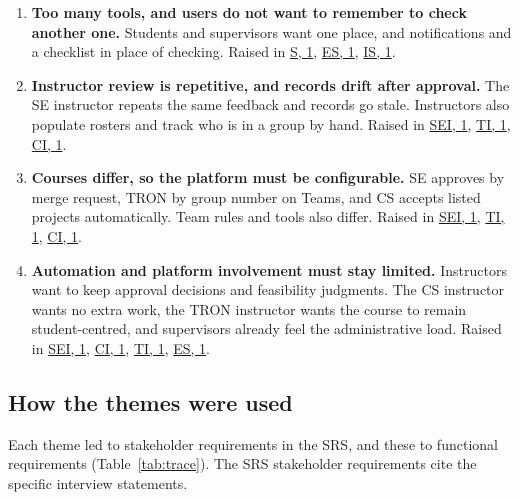 \documentclass{article}
\newcommand{\intlink}[3]{\hyperref[int:#1-#2]{#3}}
\newcommand{\intref}[2]{\intlink{#1}{#2}{#1, #2}}
\begin{document}
\begin{enumerate}
        \item \textbf{Too many tools, and users do not want to remember to check another one.}
        Students and supervisors want one place, and notifications and a checklist in place of checking.
        Raised in \intref{S}{1}, \intref{ES}{1}, \intref{IS}{1}.

        \item \textbf{Instructor review is repetitive, and records drift after approval.}
        The SE instructor repeats the same feedback and records go stale. Instructors also populate rosters
        and track who is in a group by hand. Raised in \intref{SEI}{1}, \intref{TI}{1}, \intref{CI}{1}.

        \item \textbf{Courses differ, so the platform must be configurable.}
        SE approves by merge request, TRON by group number on Teams, and CS accepts listed projects
        automatically. Team rules and tools also differ. Raised in \intref{SEI}{1}, \intref{TI}{1},
        \intref{CI}{1}.

        \item \textbf{Automation and platform involvement must stay limited.}
        Instructors want to keep approval decisions and feasibility judgments. The CS instructor wants
        no extra work, the TRON instructor wants the course to remain student-centred, and supervisors
        already feel the administrative load. Raised in \intref{SEI}{1}, \intref{CI}{1}, \intref{TI}{1},
        \intref{ES}{1}.
    \end{enumerate}

    \subsection{How the themes were used}

    Each theme led to stakeholder requirements in the SRS, and these to functional requirements
    (Table~\ref{tab:trace}). The SRS stakeholder requirements cite the specific interview statements.
\end{document}
